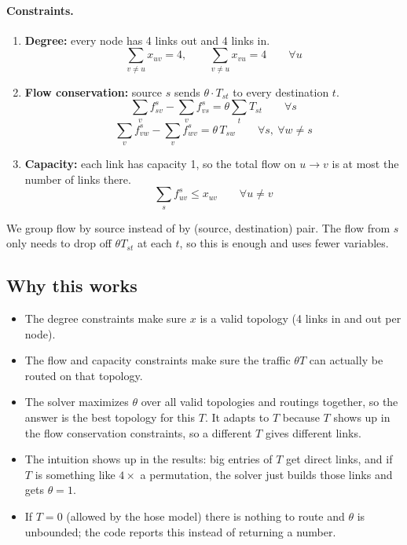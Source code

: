 \paragraph{Constraints.}
\begin{enumerate}
  \item \textbf{Degree:} every node has 4 links out and 4 links in.
  \[
  \sum_{v \neq u} x_{uv} = 4, \qquad \sum_{v \neq u} x_{vu} = 4 \qquad \forall u
  \]
  \item \textbf{Flow conservation:} source $s$ sends $\theta \cdot T_{st}$ to every destination $t$.
  \[
  \sum_{v} f^s_{sv} - \sum_{v} f^s_{vs} = \theta \sum_{t} T_{st} \qquad \forall s
  \]
  \[
  \sum_{v} f^s_{vw} - \sum_{v} f^s_{wv} = \theta \, T_{sw} \qquad \forall s, \ \forall w \neq s
  \]
  \item \textbf{Capacity:} each link has capacity 1, so the total flow on $u \rightarrow v$ is at
        most the number of links there.
  \[
  \sum_{s} f^s_{uv} \le x_{uv} \qquad \forall u \neq v
  \]
\end{enumerate}

We group flow by source instead of by (source, destination) pair. The flow from $s$ only needs to
drop off $\theta T_{st}$ at each $t$, so this is enough and uses fewer variables.

\subsection*{Why this works}

\begin{itemize}
  \item The degree constraints make sure $x$ is a valid topology (4 links in and out per node).
  \item The flow and capacity constraints make sure the traffic $\theta T$ can actually be routed on
        that topology.
  \item The solver maximizes $\theta$ over all valid topologies and routings together, so the answer
        is the best topology for this $T$. It adapts to $T$ because $T$ shows up in the flow
        conservation constraints, so a different $T$ gives different links.
  \item The intuition shows up in the results: big entries of $T$ get direct links, and
        if $T$ is something like $4 \times$ a permutation, the solver just builds those links and gets
        $\theta = 1$.
  \item If $T = 0$ (allowed by the hose model) there is nothing to route and $\theta$ is unbounded;
        the code reports this instead of returning a number.
\end{itemize}

